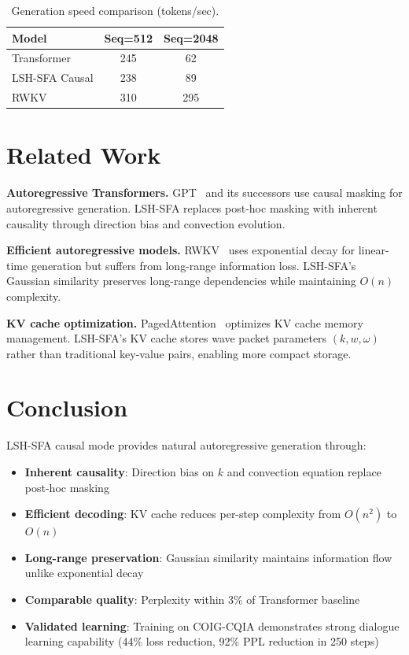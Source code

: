 \documentclass{article}
\begin{document}
\begin{table}[h]
\centering
\caption{Generation speed comparison (tokens/sec).}
\label{tab:speed}
\begin{tabular}{lcc}
\toprule
\textbf{Model} & \textbf{Seq=512} & \textbf{Seq=2048} \\
\midrule
Transformer & 245 & 62 \\
LSH-SFA Causal & 238 & 89 \\
RWKV & 310 & 295 \\
\bottomrule
\end{tabular}
\end{table}

\section{Related Work}

\textbf{Autoregressive Transformers.} GPT~\citep{radford2019language} and its successors use causal masking for autoregressive generation. LSH-SFA replaces post-hoc masking with inherent causality through direction bias and convection evolution.

\textbf{Efficient autoregressive models.} RWKV~\citep{peng2023rwkv} uses exponential decay for linear-time generation but suffers from long-range information loss. LSH-SFA's Gaussian similarity preserves long-range dependencies while maintaining $O(n)$ complexity.

\textbf{KV cache optimization.} PagedAttention~\citep{kwon2023efficient} optimizes KV cache memory management. LSH-SFA's KV cache stores wave packet parameters $(k, w, \omega)$ rather than traditional key-value pairs, enabling more compact storage.

\section{Conclusion}

LSH-SFA causal mode provides natural autoregressive generation through:

\begin{itemize}
\item \textbf{Inherent causality}: Direction bias on $k$ and convection equation replace post-hoc masking
\item \textbf{Efficient decoding}: KV cache reduces per-step complexity from $O(n^2)$ to $O(n)$
\item \textbf{Long-range preservation}: Gaussian similarity maintains information flow unlike exponential decay
\item \textbf{Comparable quality}: Perplexity within 3\% of Transformer baseline
\item \textbf{Validated learning}: Training on COIG-CQIA demonstrates strong dialogue learning capability (44\% loss reduction, 92\% PPL reduction in 250 steps)
\end{itemize}
\end{document}
